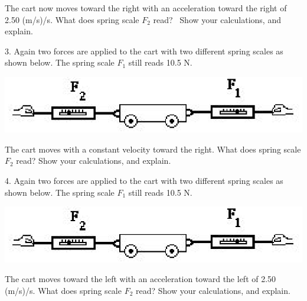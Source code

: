The cart now moves toward the right with an acceleration toward the right of
2.50 (m/s)/s. What does spring scale \( F_{2} \) read?~ Show your calculations,
and explain.
\vspace{20mm}

3. Again two forces are applied to the cart with two different spring scales
as shown below. The spring scale \( F_{1} \) still reads 10.5 N.

\vspace{0.3cm}
{\par\centering \includegraphics{combining/combining_fig4.eps} \par}
\vspace{0.3cm}

The cart moves with a constant velocity toward the right. What does spring scale
\( F_{2} \) read? Show your calculations, and explain.
\vspace{20mm}

4. Again two forces are applied to the cart with two different spring scales
as shown below. The spring scale \( F_{1} \) still reads 10.5 N.

\vspace{0.3cm}
{\par\centering \includegraphics{combining/combining_fig4.eps} \par}
\vspace{0.3cm}

The cart moves toward the left with an acceleration toward the left of 2.50
(m/s)/s. What does spring scale \( F_{2} \) read? Show your calculations, and
explain.

